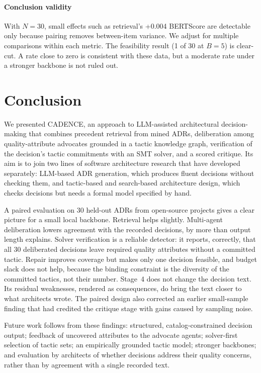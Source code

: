 \documentclass[preprint,12pt,authoryear]{elsarticle}
\renewcommand{\_}{\textunderscore\allowbreak{}}
\begin{document}
\paragraph{Conclusion validity} With $N=30$, small effects such as retrieval's +0.004 BERTScore are detectable only because pairing removes between-item variance. We adjust for multiple comparisons within each metric. The feasibility result (1 of 30 at $B=5$) is clear-cut. A rate close to zero is consistent with these data, but a moderate rate under a stronger backbone is not ruled out.

\section{Conclusion}
\label{sec:conclusion}

We presented CADENCE, an approach to LLM-assisted architectural decision-making that combines precedent retrieval from mined ADRs, deliberation among quality-attribute advocates grounded in a tactic knowledge graph, verification of the decision's tactic commitments with an SMT solver, and a scored critique. Its aim is to join two lines of software architecture research that have developed separately: LLM-based ADR generation, which produces fluent decisions without checking them, and tactic-based and search-based architecture design, which checks decisions but needs a formal model specified by hand.

A paired evaluation on 30 held-out ADRs from open-source projects gives a clear picture for a small local backbone. Retrieval helps slightly. Multi-agent deliberation lowers agreement with the recorded decisions, by more than output length explains. Solver verification is a reliable detector: it reports, correctly, that all 30 deliberated decisions leave required quality attributes without a committed tactic. Repair improves coverage but makes only one decision feasible, and budget slack does not help, because the binding constraint is the diversity of the committed tactics, not their number. Stage~4 does not change the decision text. Its residual weaknesses, rendered as consequences, do bring the text closer to what architects wrote. The paired design also corrected an earlier small-sample finding that had credited the critique stage with gains caused by sampling noise.

Future work follows from these findings: structured, catalog-constrained decision output; feedback of uncovered attributes to the advocate agents; solver-first selection of tactic sets; an empirically grounded tactic model; stronger backbones; and evaluation by architects of whether decisions address their quality concerns, rather than by agreement with a single recorded text.
\end{document}
